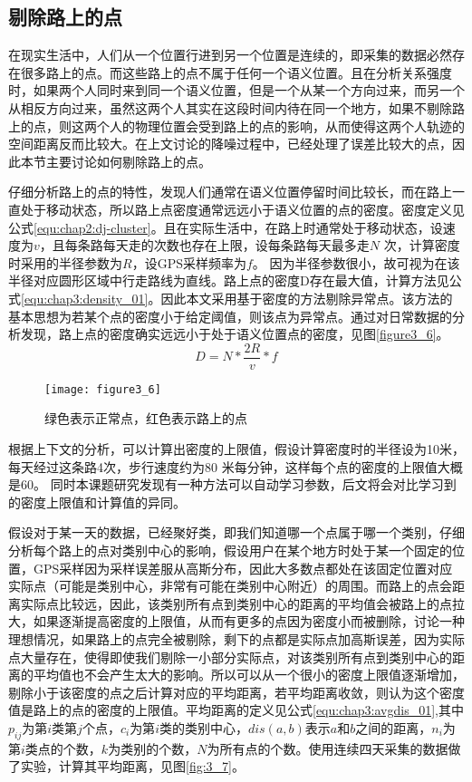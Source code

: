 \subsection{剔除路上的点}
在现实生活中，人们从一个位置行进到另一个位置是连续的，即采集的数据必然存在很多路上的点。而这些路上的点不属于任何一个语义位置。且在分析关系强度时，如果两个人同时来到同一个语义位置，但是一个从某一个方向过来，而另一个从相反方向过来，虽然这两个人其实在这段时间内待在同一个地方，如果不剔除路上的点，则这两个人的物理位置会受到路上的点的影响，从而使得这两个人轨迹的空间距离反而比较大。在上文讨论的降噪过程中，已经处理了误差比较大的点，因此本节主要讨论如何剔除路上的点。
\par 仔细分析路上的点的特性，发现人们通常在语义位置停留时间比较长，而在路上一直处于移动状态，所以路上点密度通常远远小于语义位置的点的密度。密度定义见公式\ref{equ:chap2:dj-cluster}。且在实际生活中，在路上时通常处于移动状态，设速度为$v$，且每条路每天走的次数也存在上限，设每条路每天最多走$N$ 次，计算密度时采用的半径参数为$R$，设GPS采样频率为$f$。 因为半径参数很小，故可视为在该半径对应圆形区域中行走路线为直线。路上点的密度D存在最大值，计算方法见公式\ref{equ:chap3:density_01}。因此本文采用基于密度的方法剔除异常点。该方法的基本思想为若某个点的密度小于给定阈值，则该点为异常点。通过对日常数据的分析发现，路上点的密度确实远远小于处于语义位置点的密度，见图\ref{figure3_6}。
\begin{equation}
\label{equ:chap3:density_01}
D=N \ast \frac{2R}{v} \ast f
\end{equation}
\begin{figure}[htp]
\centering
\texttt{[image: figure3\_6]}
\caption{绿色表示正常点，红色表示路上的点}
\label{fig:3_6}
\end{figure}
\par 根据上下文的分析，可以计算出密度的上限值，假设计算密度时的半径设为10米，每天经过这条路4次，步行速度约为80 米每分钟，这样每个点的密度的上限值大概是60。 同时本课题研究发现有一种方法可以自动学习参数，后文将会对比学习到的密度上限值和计算值的异同。
\par 假设对于某一天的数据，已经聚好类，即我们知道哪一个点属于哪一个类别，仔细分析每个路上的点对类别中心的影响，假设用户在某个地方时处于某一个固定的位置，GPS采样因为采样误差服从高斯分布，因此大多数点都处在该固定位置对应实际点（可能是类别中心，非常有可能在类别中心附近）的周围。而路上的点会距离实际点比较远，因此，该类别所有点到类别中心的距离的平均值会被路上的点拉大，如果逐渐提高密度的上限值，从而有更多的点因为密度小而被删除，讨论一种理想情况，如果路上的点完全被剔除，剩下的点都是实际点加高斯误差，因为实际点大量存在，使得即使我们剔除一小部分实际点，对该类别所有点到类别中心的距离的平均值也不会产生太大的影响。所以可以从一个很小的密度上限值逐渐增加，剔除小于该密度的点之后计算对应的平均距离，若平均距离收敛，则认为这个密度值是路上的点的密度的上限值。平均距离的定义见公式\ref{equ:chap3:avgdis_01},其中$p_{ij}$为第$i$类第$j$个点，$c_{i}$为第$i$类的类别中心，$dis(a,b)$表示$a$和$b$之间的距离，$n_{i}$为第$i$类点的个数，$k$为类别的个数，$N$为所有点的个数。使用连续四天采集的数据做了实验，计算其平均距离，见图\ref{fig:3_7}。

